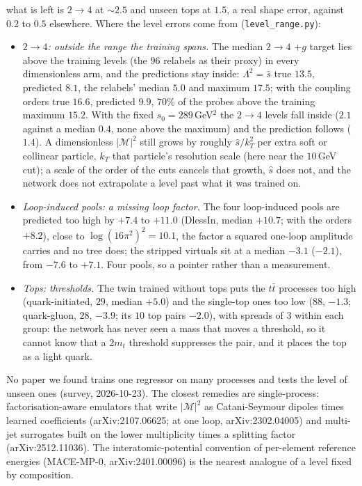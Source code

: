\documentclass[11pt]{article}
\newcommand{\code}[1]{\texttt{#1}}
\begin{document}
what is left is $2\to4$ at $\sim2.5$ and unseen tops at $1.5$, a real shape error, against $0.2$ to $0.5$ elsewhere.
Where the level errors come from (\code{level\_range.py}):
\begin{itemize}
  \item \emph{$2\to4$: outside the range the training spans.} The median $2\to4$ $+g$ target lies above the training levels
  (the $96$ relabels as their proxy) in every dimensionless arm, and the predictions stay inside: $\Lambda^2=\hat s$ true
  $13.5$, predicted $8.1$, the relabels' median $5.0$ and maximum $17.5$; with the coupling orders true $16.6$, predicted $9.9$,
  $70\%$ of the probes above the training maximum $15.2$. With the fixed $s_0=289$\,GeV$^2$ the $2\to4$ levels fall inside
  ($2.1$ against a median $0.4$, none above the maximum) and the prediction follows ($1.4$). A dimensionless $|\mathcal M|^2$
  still grows by roughly $\hat s/k_T^2$ per extra soft or collinear particle, $k_T$ that particle's resolution scale
  (here near the $10$\,GeV cut); a scale of the order of the cuts cancels that growth, $\hat s$ does not, and the network does
  not extrapolate a level past what it was trained on.
  \item \emph{Loop-induced pools: a missing loop factor.} The four loop-induced pools are predicted too high by $+7.4$ to
  $+11.0$ (DlessIn, median $+10.7$; with the orders $+8.2$), close to $\log(16\pi^2)^2=10.1$, the factor a squared one-loop
  amplitude carries and no tree does; the stripped virtuals sit at a median $-3.1$ ($-2.1$), from $-7.6$ to $+7.1$. Four
  pools, so a pointer rather than a measurement.
  \item \emph{Tops: thresholds.} The twin trained without tops puts the $t\bar t$ processes too high (quark-initiated,
  $29$, median $+5.0$) and the single-top ones too low ($88$, $-1.3$; quark-gluon, $28$, $-3.9$; its $10$ top pairs $-2.0$), with spreads of $3$ within each
  group: the network has never seen a mass that moves a threshold, so it cannot know that a $2m_t$ threshold suppresses the
  pair, and it places the top as a light quark.
\end{itemize}
No paper we found trains one regressor on many processes and tests the level of unseen ones (survey, 2026-10-23). The
closest remedies are single-process: factorisation-aware emulators that write $|\mathcal M|^2$ as Catani-Seymour dipoles
times learned coefficients (arXiv:2107.06625; at one loop, arXiv:2302.04005) and multi-jet surrogates built on the lower
multiplicity times a splitting factor (arXiv:2512.11036). The interatomic-potential convention of per-element reference
energies (MACE-MP-0, arXiv:2401.00096) is the nearest analogue of a level fixed by composition.
\end{document}
